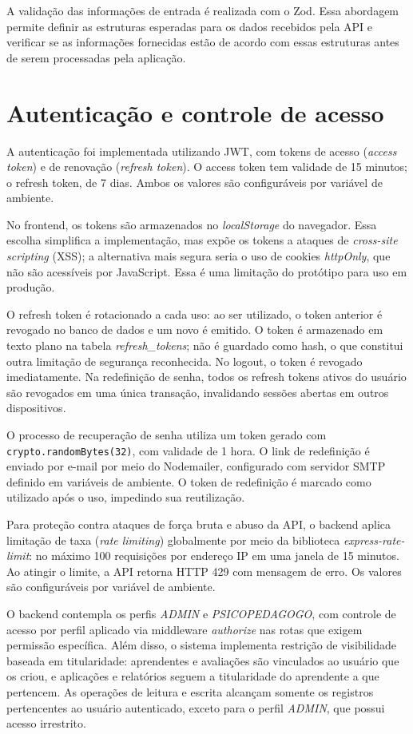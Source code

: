 A validação das informações de entrada é realizada com o Zod. Essa abordagem permite definir as estruturas esperadas para os dados recebidos pela API e verificar se as informações fornecidas estão de acordo com essas estruturas antes de serem processadas pela aplicação.

\section{Autenticação e controle de acesso}

A autenticação foi implementada utilizando JWT, com tokens de acesso (\textit{access token}) e de renovação (\textit{refresh token}). O access token tem validade de 15 minutos; o refresh token, de 7 dias. Ambos os valores são configuráveis por variável de ambiente.

No frontend, os tokens são armazenados no \textit{localStorage} do navegador. Essa escolha simplifica a implementação, mas expõe os tokens a ataques de \textit{cross-site scripting} (XSS); a alternativa mais segura seria o uso de cookies \textit{httpOnly}, que não são acessíveis por JavaScript. Essa é uma limitação do protótipo para uso em produção.

O refresh token é rotacionado a cada uso: ao ser utilizado, o token anterior é revogado no banco de dados e um novo é emitido. O token é armazenado em texto plano na tabela \textit{refresh\_tokens}; não é guardado como hash, o que constitui outra limitação de segurança reconhecida. No logout, o token é revogado imediatamente. Na redefinição de senha, todos os refresh tokens ativos do usuário são revogados em uma única transação, invalidando sessões abertas em outros dispositivos.

O processo de recuperação de senha utiliza um token gerado com \texttt{crypto.randomBytes(32)}, com validade de 1 hora. O link de redefinição é enviado por e-mail por meio do Nodemailer, configurado com servidor SMTP definido em variáveis de ambiente. O token de redefinição é marcado como utilizado após o uso, impedindo sua reutilização.

Para proteção contra ataques de força bruta e abuso da API, o backend aplica limitação de taxa (\textit{rate limiting}) globalmente por meio da biblioteca \textit{express-rate-limit}: no máximo 100 requisições por endereço IP em uma janela de 15 minutos. Ao atingir o limite, a API retorna HTTP 429 com mensagem de erro. Os valores são configuráveis por variável de ambiente.

O backend contempla os perfis \textit{ADMIN} e \textit{PSICOPEDAGOGO}, com controle de acesso por perfil aplicado via middleware \textit{authorize} nas rotas que exigem permissão específica. Além disso, o sistema implementa restrição de visibilidade baseada em titularidade: aprendentes e avaliações são vinculados ao usuário que os criou, e aplicações e relatórios seguem a titularidade do aprendente a que pertencem. As operações de leitura e escrita alcançam somente os registros pertencentes ao usuário autenticado, exceto para o perfil \textit{ADMIN}, que possui acesso irrestrito.

